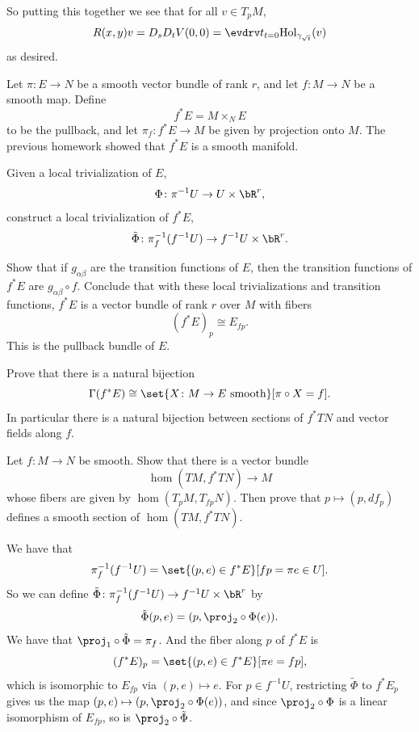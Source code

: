 So putting this together we see that for all $v\in T_pM$,
$$ R(x,y)v = D_sD_tV(0,0) = \evdrv t_{t=0}\hol_{\gamma_{\sqrt t}}(v) $$
as desired.

\bprob

    Let $\pi\colon E\to N$ be a smooth vector bundle of rank $r$, and let $f\colon M\to N$ be a smooth map.
    Define
    $$ f^*E = M\times_NE $$
    to be the pullback, and let $\pi_f\colon f^*E\to M$ be given by projection onto $M$.
    The previous homework showed that $f^*E$ is a smooth manifold.
    \benum
        \item Given a local trivialization of $E$,
        $$ \Phi\colon \pi^{-1}U\to U\times\bR^r, $$
        construct a local trivialization of $f^*E$,
        $$ \tilde\Phi\colon \pi_f^{-1}(f^{-1}U) \to f^{-1}U \times\bR^r . $$

        \item Show that if $g_{\alpha\beta}$ are the transition functions of $E$, then the transition functions of $f^*E$ are $g_{\alpha\beta}\circ f$.
        Conclude that with these local trivializations and transition functions, $f^*E$ is a vector bundle of rank $r$ over $M$ with fibers
        $$ (f^*E)_p \cong E_{fp} . $$
        This is the {\emphcolor pullback bundle} of $E$.

        \item Prove that there is a natural bijection
        $$ \Gamma(f^*E) \cong \set{X\colon M \to E\hbox{ smooth}}[\pi\circ X=f] . $$
        In particular there is a natural bijection between sections of $f^*TN$ and vector fields along $f$.

        \item Let $f\colon M\to N$ be smooth.
        Show that there is a vector bundle
        $$ \hom(TM,f^*TN) \to M $$
        whose fibers are given by $\hom(T_pM,T_{fp}N)$.
        Then prove that $p\mapsto(p,df_p)$ defines a smooth section of $\hom(TM,f^*TN)$.
    \eenum

\eprob

\benum
    \item We have that
    $$ \pi_f^{-1}(f^{-1}U) = \set{(p,e)\in f^*E}[fp=\pi e\in U] . $$
    So we can define $\tilde\Phi\colon\pi_f^{-1}(f^{-1}U)\to f^{-1}U\times\bR^r$ by
    $$ \tilde\Phi(p,e) = (p,\proj_2\circ\Phi(e)) . $$
    We have that $\proj_1\circ\tilde\Phi=\pi_f$.
    And the fiber along $p$ of $f^*E$ is
    $$ (f^*E)_p = \set{(p,e)\in f^*E}[\pi e=fp] , $$
    which is isomorphic to $E_{fp}$ via $(p,e)\mapsto e$.
    For $p\in f^{-1}U$, restricting $\tilde\Phi$ to $f^*E_p$ gives us the map $(p,e)\mapsto(p,\proj_2\circ\Phi(e))$, and since $\proj_2\circ\Phi$ is a linear isomorphism of $E_{fp}$,
    so is $\proj_2\circ\tilde\Phi$.

